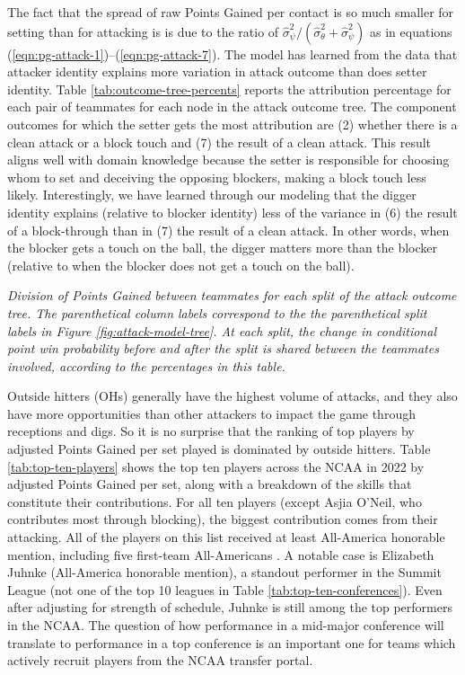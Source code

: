 \documentclass{article}
\begin{document}
The fact that the spread of raw Points Gained per contact is so much smaller for setting than for attacking is is due to the ratio of $\hat\sigma^2_\psi / (\hat\sigma^2_\theta + \hat\sigma^2_\psi)$ as in equations (\ref{eqn:pg-attack-1})--(\ref{eqn:pg-attack-7}). The model has learned from the data that attacker identity explains more variation in attack outcome than does setter identity. Table \ref{tab:outcome-tree-percents} reports the attribution percentage for each pair of teammates for each node in the attack outcome tree. The component outcomes for which the setter gets the most attribution are (2) whether there is a clean attack or a block touch and (7) the result of a clean attack. This result aligns well with domain knowledge because the setter is responsible for choosing whom to set and deceiving the opposing blockers, making a block touch less likely. Interestingly, we have learned through our modeling that the digger identity explains (relative to blocker identity) less of the variance in (6) the result of a block-through than in (7) the result of a clean attack. In other words, when the blocker gets a touch on the ball, the digger matters more than the blocker (relative to when the blocker does not get a touch on the ball).

\begin{table}
    \centering
    
    \caption{\it Division of Points Gained between teammates for each split of the attack outcome tree. The parenthetical column labels correspond to the the parenthetical split labels in Figure \ref{fig:attack-model-tree}. At each split, the change in conditional point win probability before and after the split is shared between the teammates involved, according to the percentages in this table.}
    \label{tab:outcome-tree-percents}
\end{table}

Outside hitters (OHs) generally have the highest volume of attacks, and they also have more opportunities than other attackers to impact the game through receptions and digs. So it is no surprise that the ranking of top players by adjusted Points Gained per set played is dominated by outside hitters. Table \ref{tab:top-ten-players} shows the top ten players across the NCAA in 2022 by adjusted Points Gained per set, along with a breakdown of the skills that constitute their contributions. For all ten players (except Asjia O'Neil, who contributes most through blocking), the biggest contribution comes from their attacking. All of the players on this list received at least All-America honorable mention, including five first-team All-Americans \citep{avca_all_america}. A notable case is Elizabeth Juhnke (All-America honorable mention), a standout performer in the Summit League (not one of the top 10 leagues in Table \ref{tab:top-ten-conferences}). Even after adjusting for strength of schedule, Juhnke is still among the top performers in the NCAA. The question of how performance in a mid-major conference will translate to performance in a top conference is an important one for teams which actively recruit players from the NCAA transfer portal.
\end{document}
